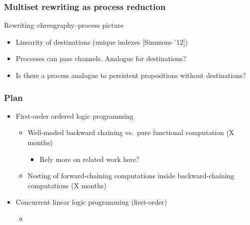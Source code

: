 \documentclass{beamer}
\begin{document}
\begin{frame}
  \frametitle{Multiset rewriting as process reduction}

  \begin{center}
    Rewriting--chreography--process picture
  \end{center}

  \begin{itemize}
  \item Linearity of destinations (unique indexes [Simmons '12])
  \item Processes can pass channels.  Analogue for destinations?
  \item Is there a process analogue to persistent propositions without destinations?
  \end{itemize}
\end{frame}


\begin{frame}
  \frametitle{Plan}

  \begin{itemize}
  \item First-order ordered logic programming
    \begin{itemize}
    \item Well-moded backward chaining vs.\ pure functional computation (X months)
      \begin{itemize}
      \item Rely more on related work here?
      \end{itemize}
    \item Nesting of forward-chaining computations inside backward-chaining computations (X months)
    \end{itemize}
  \item Concurrent linear logic programming (first-order)
    \begin{itemize}
    \item 
    \end{itemize}
  \end{itemize}
\end{frame}
\end{document}
